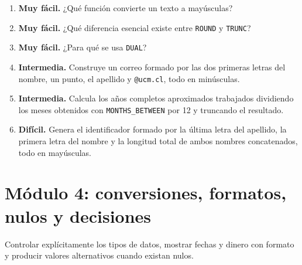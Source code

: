 \documentclass[11pt,a4paper]{article}
\newcommand{\campo}[1]{\texttt{#1}}
\newcommand{\tabla}[1]{\texttt{#1}}
\newcommand{\nivel}[1]{\textbf{#1}}
\begin{document}
\begin{enumerate}[label=\textbf{M3.\arabic*}]
  \item \nivel{Muy fácil.} ¿Qué función convierte un texto a mayúsculas?
  \item \nivel{Muy fácil.} ¿Qué diferencia esencial existe entre \campo{ROUND} y \campo{TRUNC}?
  \item \nivel{Muy fácil.} ¿Para qué se usa \tabla{DUAL}?
  \item \nivel{Intermedia.} Construye un correo formado por las dos primeras letras del nombre, un
  punto, el apellido y \campo{@ucm.cl}, todo en minúsculas.
  \item \nivel{Intermedia.} Calcula los años completos aproximados trabajados dividiendo los meses
  obtenidos con \campo{MONTHS\_BETWEEN} por 12 y truncando el resultado.
  \item \nivel{Difícil.} Genera el identificador formado por la última letra del apellido, la primera
  letra del nombre y la longitud total de ambos nombres concatenados, todo en mayúsculas.
\end{enumerate}

\section{Módulo 4: conversiones, formatos, nulos y decisiones}

\begin{objetivo}
Controlar explícitamente los tipos de datos, mostrar fechas y dinero con formato y producir valores
alternativos cuando existan nulos.
\end{objetivo}
\end{document}

